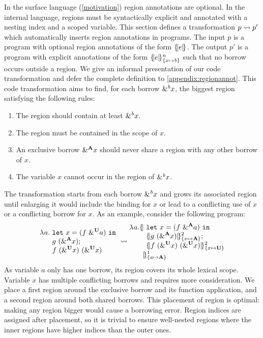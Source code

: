 In the surface language (\cref{motivation}) region annotations are optional.
In the internal language, regions must be syntactically explicit and
annotated with a nesting index and a scoped variable.
This section defines a transformation $\RannotT{p}{p'}$ which
automatically inserts region annotations in  programs.
The input $p$ is a program with optional region annotations of the form $\region[]{}{e}$.
The output $p'$ is a program with explicit annotations
of the form $\region{\Sone x\BORROW}{e}$ such that no borrow occurs
outside a region.
We give an informal presentation of our code transformation and defer
the complete definition to \cref{appendix:regionannot}. This code transformation
aims to find, for each borrow $\borrow{x}$, the biggest region satisfying
the following rules:
\begin{enumerate}
\item The region should contain at least $\borrow{x}$.
\item The region must be contained in the scope of $x$.
\item An exclusive borrow $\borrow[\kaff]{x}$ should never share a region with any other borrow of $x$.
\item The variable $x$ cannot occur in the region of $\borrow{x}$.
\end{enumerate}
The transformation starts from each borrow $\borrow x$ and grows its associated
region until enlarging it would include the binding for $x$ or lead to a
conflicting use of $x$ or a conflicting borrow for $x$.
As an example, consider the following program:
%
\[
  \setlength{\jot}{-1pt}
  \RannotT{
\begin{aligned}
  \lam{a}{}\ &
  \letin{x}{\app{f}{\borrow[\kun]{a}}}{}\\
  &g\ (\borrow[\kaff]{x});\\
  &f\ (\borrow[\kun]{x})\ (\borrow[\kun]{x})\\
\end{aligned}
}{
\begin{aligned}
  \lam{a}{}\region[1]{\Sone a\MBORROW}{\ &%
  \letin{x}{\app{f}{\borrow[\kaff]{a}}}{}\\
  &\region[2]{\Sone x\MBORROW}{g\ (\borrow[\kaff]{x})};\\
  &\region[2]{\Sone x\IBORROW}{f\ (\borrow[\kun]{x})\ (\borrow[\kun]{x})}\\
  &\!\!\!}
\end{aligned}
}
\]
%
As variable $a$ only has one borrow, its region covers its whole lexical scope.
Variable $x$ has multiple conflicting borrows and requires more consideration.
We place a first
region around the exclusive borrow and its function application,
and a second region around both shared borrows. This placement of region
is optimal: making any region bigger would cause a borrowing
error.
Region indices are assigned after placement, so it is trivial to
ensure well-nested regions where the inner regions have
higher indices than the outer ones.

